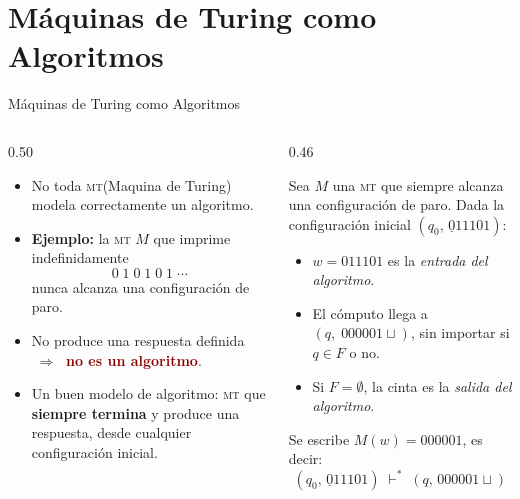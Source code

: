 \documentclass[aspectratio=1610, 12pt]{beamer}
\newcommand{\MT}{\textsc{mt}}
\newcommand{\blank}{\sqcup}
\begin{document}
\section{Máquinas de Turing como Algoritmos}

\begin{frame}[t]{Máquinas de Turing como Algoritmos}
\vspace{4pt}
\begin{columns}[T]

  \begin{column}{0.50\textwidth}
    \begin{itemize}\setlength{\itemsep}{4pt}
      \item No toda \MT{}(Maquina de Turing) modela correctamente un algoritmo.
      \item \textbf{Ejemplo:} la \MT{} $M$ que imprime indefinidamente
        \[
          0\;1\;0\;1\;0\;1\;\cdots
        \]
        nunca alcanza una configuración de paro.
      \item No produce una respuesta definida
        $\;\Rightarrow\;$
        \textcolor{DarkRed}{\textbf{no es un algoritmo}}.
      \item Un buen modelo de algoritmo: \MT{} que \textbf{siempre termina}
        y produce una respuesta, desde cualquier configuración inicial.
    \end{itemize}
  \end{column}

  \begin{column}{0.46\textwidth}
    \begin{defbox}
      \footnotesize
      Sea $M$ una \MT{} que siempre alcanza una configuración de paro.
      Dada la configuración inicial $(q_0,\,\underline{0}11101)$:
      \begin{itemize}\setlength{\itemsep}{3pt}
        \item[\textcolor{MedBlue}{$\bullet$}]
          $w = 011101$ es la \emph{entrada del algoritmo}.
        \item[\textcolor{MedBlue}{$\bullet$}]
          El cómputo llega a $(q,\;000001\blank)$,
          sin importar si $q \in F$ o no.
        \item[\textcolor{MedBlue}{$\bullet$}]
          Si $F = \emptyset$, la cinta es la \emph{salida del algoritmo}.
      \end{itemize}
      \vspace{3pt}
      Se escribe $M(w) = 000001$, es decir:
      \[
        (q_0,\,\underline{0}11101) \;\vdash^*\; (q,\,000001\blank)
      \]
    \end{defbox}
  \end{column}

\end{columns}
\end{frame}
\end{document}

